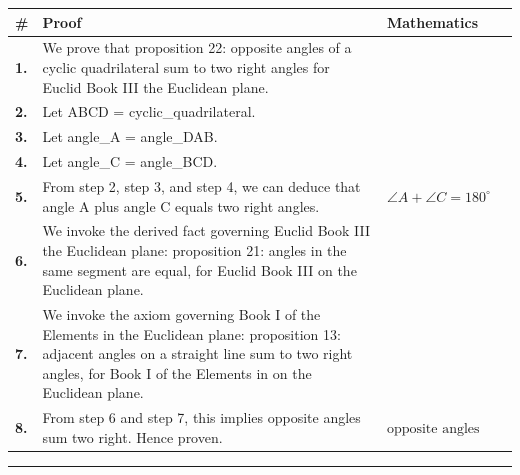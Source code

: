 \documentclass[11pt]{article}
\theoremstyle{definition}
\begin{document}
\begin{tabular}{@{} >{\raggedright\arraybackslash}p{} >{\raggedright\arraybackslash}p{} >{\raggedleft\arraybackslash}p{} @{}}
\textbf{\#} & \textbf{Proof} & \textbf{Mathematics} \\
\midrule
\textbf{1.} & We prove that proposition 22: opposite angles of a cyclic quadrilateral sum to two right angles for Euclid Book III the Euclidean plane. & \\[0.45em]
\textbf{2.} & Let ABCD = cyclic\_quadrilateral. & \\[0.45em]
\textbf{3.} & Let angle\_A = angle\_DAB. & \\[0.45em]
\textbf{4.} & Let angle\_C = angle\_BCD. & \\[0.45em]
\textbf{5.} & From step 2, step 3, and step 4, we can deduce that angle A plus angle C equals two right angles. & $\displaystyle \angle A + \angle C = 180^\circ$ \\[0.45em]
\textbf{6.} & We invoke the derived fact governing Euclid Book III the Euclidean plane: proposition 21: angles in the same segment are equal, for Euclid Book III on the Euclidean plane. & \\[0.45em]
\textbf{7.} & We invoke the axiom governing Book I of the Elements in the Euclidean plane: proposition 13: adjacent angles on a straight line sum to two right angles, for Book I of the Elements in on the Euclidean plane. & \\[0.45em]
\textbf{8.} & From step 6 and step 7, this implies opposite angles sum two right. Hence proven. & $\displaystyle \text{opposite angles sum two right}$ \\[0.45em]
\bottomrule
\end{tabular}
\label{thm:Geometry-Euclid Book III-proposition_22_opposite_angles_of_a_cyclic_quadrilateral_sum_to_two_right_angles}
\par\medskip\hrule
\end{document}
